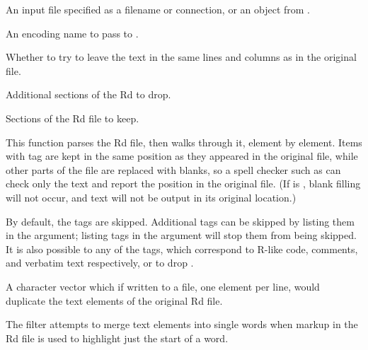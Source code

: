 %
\begin{Arguments}
\begin{ldescription}
\item[\code{ifile}] 
An input file specified as a filename or connection, or an  object
from .

\item[\code{encoding}] 
An encoding name to pass to .

\item[\code{keepSpacing}] 
Whether to try to leave the text in the same lines and columns
as in the original file.

\item[\code{drop}] 
Additional sections of the Rd to drop.

\item[\code{keep}] 
Sections of the Rd file to keep.

\end{ldescription}
\end{Arguments}
%
\begin{Details}\relax
This function parses the Rd file, then walks through it, element by
element.  Items with tag  are kept in the same position as
they appeared in the original file, while other parts of the file are
replaced with blanks, so a spell checker such as 
can check only the text and report the position in the original file.
(If  is , blank filling will not occur,
and text will not be output in its original location.)

By default, the tags  are skipped.  Additional tags
can be skipped by listing them in the  argument; listing
tags in the  argument will stop them from being skipped.
It is also possible to  any of the  tags, which correspond to R-like code, comments, and verbatim
text respectively, or to drop .
\end{Details}
%
\begin{Value}
A character vector which if written to a file, one element per line, would 
duplicate the text elements of the original Rd file.
\end{Value}
%
\begin{Note}\relax
The filter attempts to merge text elements into single words when markup in
the Rd file is used to highlight just the start of a word.
\end{Note}
